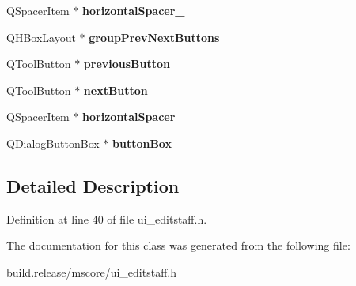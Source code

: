 \begin{DoxyCompactItemize}
Q\+Spacer\+Item $\ast$ {\bfseries horizontal\+Spacer\+\_}
\item 
\mbox{\label{class_ui___edit_staff_base_a594e890774e61c7a53378b3600e9fc1e}} 
Q\+H\+Box\+Layout $\ast$ {\bfseries group\+Prev\+Next\+Buttons}
\item 
\mbox{\label{class_ui___edit_staff_base_acbe062d82b26161cde66fe5f402b3d0f}} 
Q\+Tool\+Button $\ast$ {\bfseries previous\+Button}
\item 
\mbox{\label{class_ui___edit_staff_base_aeec227391597f8bbbe0bde2e9072ad6a}} 
Q\+Tool\+Button $\ast$ {\bfseries next\+Button}
\item 
\mbox{\label{class_ui___edit_staff_base_a963e0d34d0e6cc85f6d455ed7684b8d0}} 
Q\+Spacer\+Item $\ast$ {\bfseries horizontal\+Spacer\+\_}
\item 
\mbox{\label{class_ui___edit_staff_base_aaa6d1b9637830fe99a9f1806d696a77f}} 
Q\+Dialog\+Button\+Box $\ast$ {\bfseries button\+Box}
\end{DoxyCompactItemize}


\subsection{Detailed Description}


Definition at line 40 of file ui\+\_\+editstaff.\+h.



The documentation for this class was generated from the following file\+:\begin{DoxyCompactItemize}
\item 
build.\+release/mscore/ui\+\_\+editstaff.\+h\end{DoxyCompactItemize}
